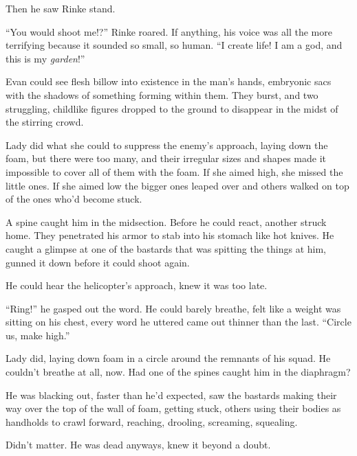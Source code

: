 Then he saw Rinke stand.



``You would shoot me!?''  Rinke roared.  If anything, his voice was all the more terrifying because it sounded so small, so human.  ``I create life!  I am a god, and this is my \emph{garden}!''



Evan could see flesh billow into existence in the man's hands, embryonic sacs with the shadows of something forming within them.  They burst, and two struggling, childlike figures dropped to the ground to disappear in the midst of the stirring crowd.



Lady did what she could to suppress the enemy's approach, laying down the foam, but there were too many, and their irregular sizes and shapes made it impossible to cover all of them with the foam.  If she aimed high, she missed the little ones.  If she aimed low the bigger ones leaped over and others walked on top of the ones who'd become stuck.



A spine caught him in the midsection.  Before he could react, another struck home.  They penetrated his armor to stab into his stomach like hot knives.  He caught a glimpse at one of the bastards that was spitting the things at him, gunned it down before it could shoot again.



He could hear the helicopter's approach, knew it was too late.



``Ring!'' he gasped out the word.  He could barely breathe, felt like a weight was sitting on his chest, every word he uttered came out thinner than the last.  ``Circle us, make high.''



Lady did, laying down foam in a circle around the remnants of his squad.  He couldn't breathe at all, now.  Had one of the spines caught him in the diaphragm?



He was blacking out, faster than he'd expected, saw the bastards making their way over the top of the wall of foam, getting stuck, others using their bodies as handholds to crawl forward, reaching, drooling, screaming, squealing.



Didn't matter.  He was dead anyways, knew it beyond a doubt.



